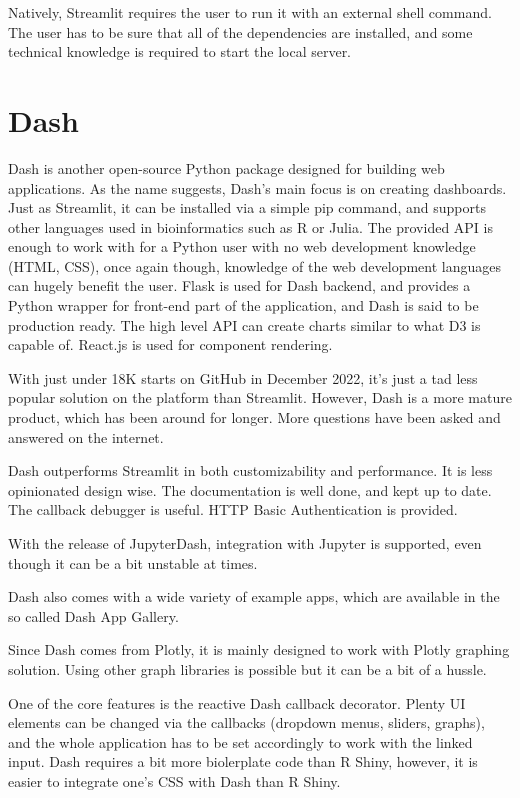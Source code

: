 Natively, Streamlit requires the user to run it with an external shell command. The user has to be sure that all of the dependencies are installed, and some technical knowledge is required to start the local server. 

\section{Dash}
\label{sec:dash}
Dash is another open-source Python package designed for building web applications. As the name suggests, Dash's main focus is on creating dashboards. Just as Streamlit, it can be installed via a simple pip command, and supports other languages used in bioinformatics such as R or Julia. The provided API is enough to work with for a Python user with no web development knowledge (HTML, CSS), once again though, knowledge of the web development languages can hugely benefit the user. Flask is used for Dash backend, and provides a Python wrapper for front-end part of the application, and Dash is said to be production ready. The high level API can create charts similar to what D3 is capable of. React.js is used for component rendering.

With just under 18K starts on GitHub in December 2022, it's just a tad less popular solution on the platform than Streamlit. However, Dash is a more mature product, which has been around for longer. More questions have been asked and answered on the internet. 

Dash outperforms Streamlit in both customizability and performance. It is less opinionated design wise. The documentation is well done, and kept up to date. The callback debugger is useful. HTTP Basic Authentication is provided. 

With the release of JupyterDash, integration with Jupyter is supported, even though it can be a bit unstable at times.

Dash also comes with a wide variety of example apps, which are available in the so called Dash App Gallery.

Since Dash comes from Plotly, it is mainly designed to work with Plotly graphing solution. Using other graph libraries is possible but it can be a bit of a hussle. 

One of the core features is the reactive Dash callback decorator. Plenty UI elements can be changed via the callbacks (dropdown menus, sliders, graphs), and the whole application has to be set accordingly to work with the linked input. Dash requires a bit more biolerplate code than R Shiny, however, it is easier to integrate one's CSS with Dash than R Shiny.

